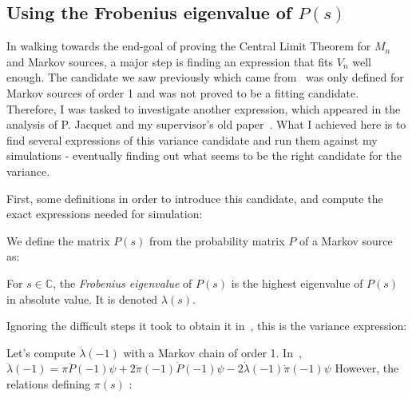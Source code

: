 
\subsection{Using the Frobenius eigenvalue of $P(s)$}

In walking towards the end-goal of proving the Central Limit
Theorem for $M_n$ and Markov sources, a major step is finding
an expression that fits $V_n$ well enough. The candidate we
saw previously which came from~\cite{leckey_limit_2015} was 
only defined for Markov sources of order 1 and was not proved
to be a fitting candidate. Therefore, I was tasked to investigate
another expression, which appeared in the analysis of 
P. Jacquet and my supervisor's old paper~\cite{jacquet_average_2001}.
What I achieved here is to find several expressions of 
this variance candidate and run them against my simulations - eventually
finding out what seems to be the right candidate for the variance.

First, some definitions in order to introduce this candidate, and 
compute the exact expressions needed for simulation:

\begin{df}
    We define the matrix $P(s)$ from the probability matrix $P$ of a 
    Markov source as:
    \label{def:ps}
\end{df}

\begin{df}
    For $s\in\mathbb{C}$, the \emph{Frobenius eigenvalue} of $P(s)$ is the highest 
    eigenvalue of $P(s)$ in absolute value. It is denoted $\lambda(s)$.
    \label{def:frob}
\end{df}

Ignoring the difficult steps it took to obtain it in~\cite{jacquet_average_2001},
this is the variance expression:


\noindent Let's compute $\ddot{\lambda}(-1)$ with a Markov chain of order 1.
In~\cite{jacquet_average_2001},
\centers
    {$ \ddot{\lambda}(-1) = \pi \ddot{P}(-1)\psi
                        + 2 \dot{\pi}(-1) \dot{P}(-1) \psi
                        - 2 \dot{\lambda}(-1) \dot{\pi}(-1) \psi $}
\noindent However, the relations defining $\pi(s)$ : 
   
         
